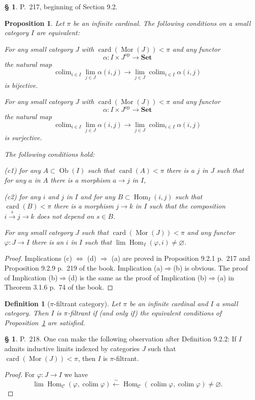\documentclass[12pt]{article}
\newtheorem{prop}[thm]{Proposition}
\newtheorem{df}[thm]{Definition}
\theoremstyle{remark}
\theoremstyle{definition}
\newtheorem{s}[thm]{\S}
\newcommand{\nn}{\noindent}
\newcommand{\C}{\mathcal C}
\newcommand{\Set}{\mathbf{Set}}
\newcommand{\pp}{\varphi}
\newcommand{\ssi}{\Leftrightarrow}
\newcommand{\then}{\Rightarrow}
\newcommand{\xr}{\xrightarrow}
\DeclareMathOperator*{\colim}{colim}
\DeclareMathOperator{\card}{card}
\DeclareMathOperator{\Hom}{Hom}
\DeclareMathOperator{\Mor}{Mor}
\DeclareMathOperator{\Ob}{Ob}
\DeclareMathOperator{\op}{op}
\begin{document}
\begin{s}
P.~217, beginning of Section 9.2. 

\begin{prop}\label{ppifil}
Let $\pi$ be an infinite cardinal. The following conditions on a small category $I$ are equivalent:

\nn{\em(a)} For any small category $J$ with $\card(\Mor(J))<\pi$ and any functor 
$$
\alpha:I\times J^{\op}\to\Set
$$ 
the natural map 
$$
\colim_{i\in I}\lim_{j\in J}\alpha(i,j)\to\lim_{j\in J}\colim_{i\in I}\alpha(i,j)
$$ 
is bijective.

\nn{\em(b)} For any small category $J$ with $\card(\Mor(J))<\pi$ and any functor 
$$
\alpha:I\times J^{\op}\to\Set
$$ 
the natural map 
$$
\colim_{i\in I}\lim_{j\in J}\alpha(i,j)\to\lim_{j\in J}\colim_{i\in I}\alpha(i,j)
$$ 
is surjective.

\nn{\em(c)} The following conditions hold:

{\em(c1)} for any $A\subset\Ob(I)$ such that $\card(A)<\pi$ there is a $j$ in $J$ such that for any $a$ in $A$ there is a morphism $a\to j$ in $I$,

{\em(c2)} for any $i$ and $j$ in $I$ and for any $B\subset\Hom_I(i,j)$ such that $\card(B)<\pi$ there is a morphism $j\to k$ in $I$ such that the composition $i\xr sj\to k$ does not depend on $s\in B$.

\nn{\em(d)} For any small category $J$ such that $\card(\Mor(J))<\pi$ and any functor $\pp:J\to I$ there is an $i$ in $I$ such that $\lim\Hom_I(\pp,i)\neq\varnothing$. 
\end{prop}

\begin{proof}
Implications (c) $\ssi$ (d) $\then$ (a) are proved in Proposition 9.2.1 p.~217 and Proposition 9.2.9 p.~219 of the book. Implication (a)$\then$(b) is obvious. The proof of Implication (b)$\then$(d) is the same as the proof of Implication (b)$\then$(a) in Theorem 3.1.6 p.~74 of the book.
\end{proof}

\begin{df}[$\pi$-filtrant category] 
Let $\pi$ be an infinite cardinal and $I$ a small category. Then $I$ is $\pi$-{\em filtrant} if (and only if) the equivalent conditions of Proposition~\ref{ppifil} are satisfied.
\end{df}
\end{s}

%

\begin{s}\label{922}
P.~218. One can make the following observation after Definition 9.2.2: If $I$ admits inductive limits indexed by categories $J$ such that $\card(\Mor(J))<\pi$, then $I$ is $\pi$-filtrant.

\begin{proof}
For $\pp:J\to I$ we have
$$
\lim\Hom_\C(\pp,\colim\pp)\xleftarrow\sim\Hom_\C(\colim\pp,\colim\pp)\neq\varnothing.
$$
\end{proof}
\end{s}
\end{document}
